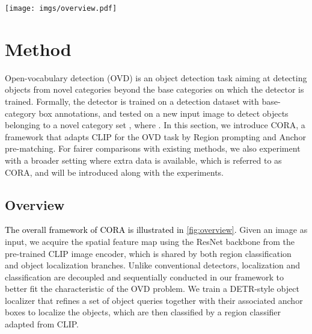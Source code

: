 \documentclass[10pt,twocolumn,letterpaper]{article}
\begin{document}
\begin{figure*}
  \centering
    \texttt{[image: imgs/overview.pdf]}
  \caption{Overview of our method. The image is encoded into a feature map by the CLIP image encoder for both localization and classification. The regional feature is extracted by pooling the feature map, and then prompted before classified by the CLIP class name embeddings. The anchor boxes are pre-matched and conditioned on a class before decoding. During training, per-class post-matching is conducted. During inference, the box predictions are classified by the region classifier. }
  \label{fig:overview}
\end{figure*}



\section{Method}
\label{sec:method}




Open-vocabulary detection (OVD) is an object detection task aiming at detecting objects from novel categories beyond the base categories on which the detector is trained. Formally, the detector is trained on a detection dataset with base-category  box annotations, and tested on a new input image  to detect objects belonging to a novel category set , where . 
In this section, we introduce CORA, a framework that adapts CLIP for the OVD task by Region prompting and Anchor pre-matching.
For fairer comparisons with existing methods, we also experiment with a broader setting where extra data is available, which is referred to as CORA, and will be introduced along with the experiments.



\subsection{Overview}


\textcolor{black}{The overall framework of CORA is illustrated in \cref{fig:overview}.}
Given an image as input, we acquire the spatial feature map using the ResNet backbone from the pre-trained CLIP image encoder, which is shared by both region classification and object localization branches.
Unlike conventional detectors, localization and classification are decoupled and sequentially conducted in our framework to better fit the characteristic of the OVD problem.
We train a DETR-style object localizer that refines a set of object queries together with their associated anchor boxes to localize the objects, which are then classified by a region classifier adapted from CLIP.
\end{document}
